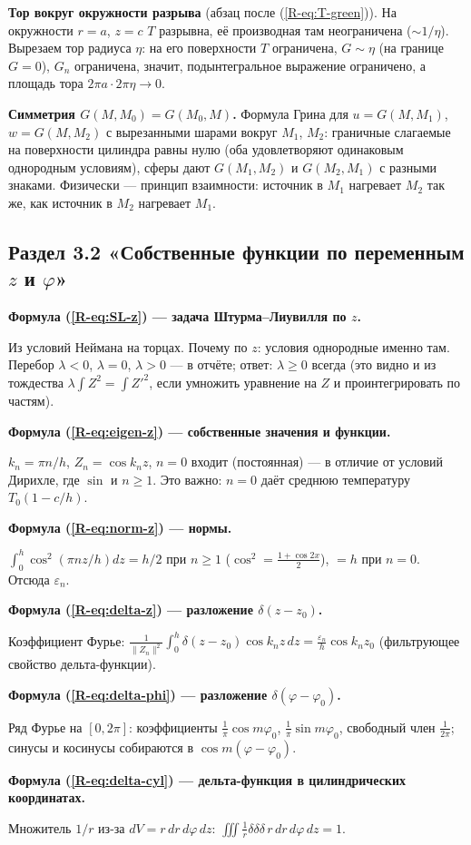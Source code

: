 \documentclass[a4paper,12pt]{article}
\renewcommand{\ge}{\geqslant}
\newcommand{\rf}[1]{(\ref*{R-#1})}
\newcommand{\fhead}[2]{\par\medskip\textbf{Формула #1 — #2.}\par\nopagebreak[4]}
\begin{document}
\textbf{Тор вокруг окружности разрыва} (абзац после \rf{eq:T-green}).
На окружности $r=a$, $z=c$ $T$ разрывна, её производная там неограничена
($\sim1/\eta$). Вырезаем тор радиуса $\eta$: на его поверхности $T$
ограничена, $G\sim\eta$ (на границе $G=0$), $G_n$ ограничена, значит,
подынтегральное выражение ограничено, а площадь тора
$2\pi a\cdot2\pi\eta\to0$.

\textbf{Симметрия $G(M,M_0)=G(M_0,M)$.} Формула Грина для
$u=G(M,M_1)$, $w=G(M,M_2)$ с вырезанными шарами вокруг $M_1$, $M_2$:
граничные слагаемые на поверхности цилиндра равны нулю (оба удовлетворяют
одинаковым однородным условиям), сферы дают $G(M_1,M_2)$ и
$G(M_2,M_1)$ с разными знаками. Физически — принцип взаимности:
источник в $M_1$ нагревает $M_2$ так же, как источник в $M_2$ нагревает
$M_1$.

\subsection{Раздел 3.2 «Собственные функции по переменным $z$ и $\varphi$»}

\fhead{\rf{eq:SL-z}}{задача Штурма–Лиувилля по $z$}
Из условий Неймана на торцах. Почему по $z$: условия однородные именно
там. Перебор $\lambda<0$, $\lambda=0$, $\lambda>0$ — в отчёте; ответ:
$\lambda\ge0$ всегда (это видно и из тождества
$\lambda\int Z^2=\int Z'^2$, если умножить уравнение на $Z$ и
проинтегрировать по частям).

\fhead{\rf{eq:eigen-z}}{собственные значения и функции}
$k_n=\pi n/h$, $Z_n=\cos k_nz$, $n=0$ входит (постоянная) — в отличие от
условий Дирихле, где $\sin$ и $n\ge1$. Это важно: $n=0$ даёт среднюю
температуру $T_0(1-c/h)$.

\fhead{\rf{eq:norm-z}}{нормы}
$\int_0^h\cos^2(\pi nz/h)dz=h/2$ при $n\ge1$ ($\cos^2=\frac{1+\cos2x}{2}$),
$=h$ при $n=0$. Отсюда $\varepsilon_n$.

\fhead{\rf{eq:delta-z}}{разложение $\delta(z-z_0)$}
Коэффициент Фурье: $\frac{1}{\|Z_n\|^2}\int_0^h\delta(z-z_0)\cos k_nz\,dz
=\frac{\varepsilon_n}{h}\cos k_nz_0$ (фильтрующее свойство дельта-функции).

\fhead{\rf{eq:delta-phi}}{разложение $\delta(\varphi-\varphi_0)$}
Ряд Фурье на $[0,2\pi]$: коэффициенты $\frac{1}{\pi}\cos m\varphi_0$,
$\frac{1}{\pi}\sin m\varphi_0$, свободный член $\frac{1}{2\pi}$; синусы и
косинусы собираются в $\cos m(\varphi-\varphi_0)$.

\fhead{\rf{eq:delta-cyl}}{дельта-функция в цилиндрических координатах}
Множитель $1/r$ из-за $dV=r\,dr\,d\varphi\,dz$:
$\iiint\frac1r\delta\delta\delta\,r\,dr\,d\varphi\,dz=1$.
\end{document}

